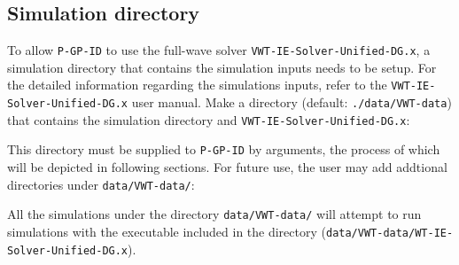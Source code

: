 




\subsection{Simulation directory}

To allow \texttt{P-GP-ID} to use the full-wave solver \texttt{VWT-IE-Solver-Unified-DG.x}, a simulation directory that contains the simulation inputs needs to be setup. For the detailed information regarding the simulations inputs, refer to the \texttt{VWT-IE-Solver-Unified-DG.x} user manual. Make a directory (default: \texttt{./data/VWT-data}) that contains the simulation directory and \texttt{VWT-IE-Solver-Unified-DG.x}:
\begin{tcolorbox}[
  colback=backcolour, 
  colframe=gray!50,
  boxrule=0pt,
  arc=0pt,
  left=0mm, right=2mm, top=2mm, bottom=2mm,
]
\end{tcolorbox}
This directory must be supplied to \texttt{P-GP-ID} by arguments, the process of which will be depicted in following sections. For future use, the user may add addtional directories under \texttt{data/VWT-data/}:
\begin{tcolorbox}[
  colback=backcolour, 
  colframe=gray!50,
  boxrule=0pt,
  arc=0pt,
  left=0mm, right=2mm, top=2mm, bottom=2mm,
]
\end{tcolorbox}
All the simulations under the directory \texttt{data/VWT-data/} will attempt to run simulations with the executable included in the directory (\texttt{data/VWT-data/WT-IE-Solver-Unified-DG.x}).


